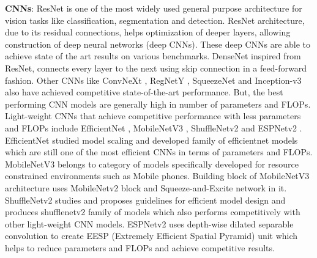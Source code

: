\documentclass{article} \usepackage{iclr2022_conference,times}
\begin{document}
\textbf{CNNs}: 
ResNet \citep{he2016deep} is one of the most widely used general purpose architecture for vision tasks like classification, segmentation and detection. 
ResNet architecture, due to its residual connections, helps optimization of deeper layers, allowing construction of deep neural networks (deep CNNs). These deep CNNs are able to achieve state of the art results on various benchmarks.
DenseNet \citep{huang2017densely} inspired from ResNet, connects every layer to the next using skip connection in a feed-forward fashion. 
Other CNNs like ConvNeXt \citep{liu2022convnet}, RegNetY \citep{radosavovic2020designing}, SqueezeNet \citep{iandola2016squeezenet} and Inception-v3 \citep{szegedy2016rethinking} also have achieved competitive state-of-the-art performance. 
But, the best performing CNN models are generally high in number of parameters and FLOPs.
Light-weight CNNs that achieve competitive performance with less parameters and FLOPs include EfficientNet  \citep{tan2019efficientnet}, MobileNetV3  \citep{howard2019searching}, ShuffleNetv2  \citep{ma2018shufflenet} and ESPNetv2  \citep{mehta2019espnetv2}.
EfficientNet studied model scaling and developed family of efficientnet models which are still one of the most efficient CNNs in terms of parameters and FLOPs. 
MobileNetV3 belongs to category of models specifically developed for resource constrained environments such as Mobile phones. 
Building block of MobileNetV3 architecture uses MobileNetv2 \citep{sandler2018mobilenetv2} block and Squeeze-and-Excite \citep{hu2018squeeze} network in it. 
ShuffleNetv2 studies and proposes guidelines for efficient model design and produces shufflenetv2 family of models which also performs competitively with other light-weight CNN models.
ESPNetv2 uses depth-wise dilated separable convolution to create EESP (Extremely Efficient Spatial Pyramid) unit which helps to reduce parameters and FLOPs and achieve competitive results. 
 
\end{document}
